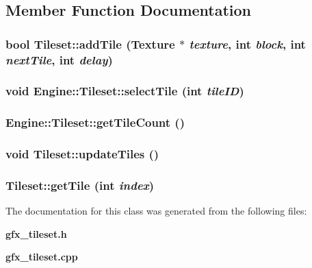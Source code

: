 \subsection{Member Function Documentation}
\subsubsection{\setlength{\rightskip}{0pt plus 5cm}bool Tileset::addTile ({\bf Texture} $\ast$ {\em texture}, int {\em block}, int {\em nextTile}, int {\em delay})}\label{classEngine_1_1Tileset_6f563bdf6e0b9f7fbaeed8e17418f761}


\subsubsection{\setlength{\rightskip}{0pt plus 5cm}void Engine::Tileset::selectTile (int {\em tileID})\hspace{0.3cm}{\tt  [inline]}}\label{classEngine_1_1Tileset_7a164547cf7fa6e72b3023089ec19347}


\subsubsection{ Engine::Tileset::getTileCount ()\hspace{0.3cm}{\tt  [inline]}}\label{classEngine_1_1Tileset_50d0ca0b21c1d25b592aab541cbdd938}


\subsubsection{\setlength{\rightskip}{0pt plus 5cm}void Tileset::updateTiles ()}\label{classEngine_1_1Tileset_c358b24b6edbf3001e42e29e7f311282}


\subsubsection{ Tileset::getTile (int {\em index})}\label{classEngine_1_1Tileset_5a7ed6efc05f0f11860b76cfffc45af8}




The documentation for this class was generated from the following files:\begin{CompactItemize}
\item 
{\bf gfx\_\-tileset.h}\item 
{\bf gfx\_\-tileset.cpp}\end{CompactItemize}
